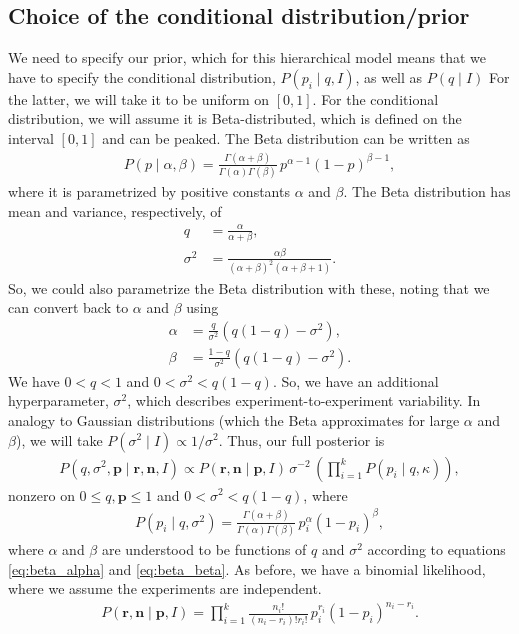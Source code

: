 \subsection{Choice of the conditional distribution/prior}
We need to specify our prior, which for this hierarchical model means
that we have to specify the conditional distribution,
$P(p_i\mid q, I)$, as well as $P(q\mid I)$ For the latter, we will
take it to be uniform on $[0, 1]$.  For the conditional distribution,
we will assume it is Beta-distributed, which is defined on the
interval $[0,1]$ and can be peaked.  The Beta distribution can be
written as
\begin{align}
P(p\mid \alpha, \beta) = \frac{\Gamma(\alpha+\beta)}{\Gamma(\alpha)\Gamma(\beta)}\,
p^{\alpha-1}(1-p)^{\beta-1},
\end{align}
where it is parametrized by positive constants $\alpha$ and $\beta$. The Beta distribution has mean and variance, respectively, of
\begin{align}
    q &= \frac{\alpha}{\alpha + \beta}, \\
    \sigma^2 &= \frac{\alpha\beta}{(\alpha + \beta)^2(\alpha + \beta + 1)}.
\end{align}
So, we could also parametrize the Beta distribution with these, noting that we can convert back to $\alpha$ and $\beta$ using
\begin{align}
    \alpha &= \frac{q}{\sigma^2}\left(q(1-q) - \sigma^2\right), \label{eq:beta_alpha}\\
    \beta &= \frac{1-q}{\sigma^2}\left(q(1-q) - \sigma^2\right).
    \label{eq:beta_beta}
\end{align}
We have $0 < q < 1$ and $0 < \sigma^2 < q(1-q)$. So, we have
an additional hyperparameter, $\sigma^2$, which describes
experiment-to-experiment variability.  In analogy to Gaussian distributions (which the Beta approximates for large $\alpha$ and $\beta$), we will take
$P(\sigma^2 \mid I) \propto 1/\sigma^2$.  Thus, our full posterior is
\begin{align}
P(q, \sigma^2,\mathbf{p}\mid \mathbf{r}, \mathbf{n},I) \propto
P(\mathbf{r},\mathbf{n}\mid \mathbf{p}, I)\,
\sigma^{-2}\,\left(\prod_{i=1}^k P(p_i\mid q,\kappa)\right),
\end{align}
nonzero on $0\le q,\mathbf{p} \le 1$ and $0 < \sigma^2 < q(1-q)$, where
\begin{align}
P(p_i\mid q, \sigma^2) =  \frac{\Gamma(\alpha+\beta)}{\Gamma(\alpha)\Gamma(\beta)}\,
p_i^{\alpha}(1-p_i)^{\beta},
\end{align}
where $\alpha$ and $\beta$ are understood to be functions of $q$ and $\sigma^2$ according to equations \eqref{eq:beta_alpha} and \eqref{eq:beta_beta}.
As before, we have a binomial likelihood, where we assume the
experiments are independent.
\begin{align}
P(\mathbf{r},\mathbf{n}\mid \mathbf{p}, I) = \prod_{i=1}^k \frac{n_i!}{(n_i-r_i)!r_i!}\,
p_i^{r_i}(1-p_i)^{n_i-r_i}.
\end{align}


